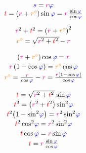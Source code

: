 \documentclass[11pt,twoside]{book}
\begin{document}
\[\begin{array}{c}
{\color{blue}s} = {\color{magenta}r} {\color{blue}\varphi} \\
{\color{red}t} = \left( {\color{magenta}r} + {\color{orange}r^{\diamond}} \right) \operatorname{sin} {\color{blue}\varphi} = {\color{magenta}r} \, \textstyle\frac{\operatorname{sin} {\color{blue}\varphi}}{\operatorname{cos} {\color{blue}\varphi}}
\end{array}\]

\[\begin{array}{c}
{\color{magenta}r}^2 + {\color{red}t}^2 = \left( {\color{magenta}r} + {\color{orange}r^{\diamond}} \right)^2 \\[0.2em]
{\color{orange}r^{\diamond}} = \sqrt{{\color{magenta}r}^2 + {\color{red}t}^2 \,} \! - {\color{magenta}r}
\end{array}\]

\[\begin{array}{c}
\left( {\color{magenta}r} + {\color{orange}r^{\diamond}} \right) \operatorname{cos} {\color{blue}\varphi} = {\color{magenta}r} \\[0.2em]
{\color{magenta}r} \left( 1 - {\operatorname{cos} {\color{blue}\varphi}} \right) = {\color{orange}r^{\diamond}} \operatorname{cos} {\color{blue}\varphi} \\[0.2em]
{\color{orange}r^{\diamond}} = \textstyle\frac{\color{magenta}r}{\operatorname{cos} {\color{blue}\varphi}} - {\color{magenta}r} = \textstyle\frac{{\color{magenta}r} \left( 1 - {\operatorname{cos} {\color{blue}\varphi}} \right)}{\operatorname{cos} {\color{blue}\varphi}}
\end{array}\]

\[\begin{array}{c}
{\color{red}t} = \sqrt{{\color{magenta}r}^2 + {\color{red}t}^2 \,} \operatorname{sin} {\color{blue}\varphi} \\[0.2em]
{\color{red}t}^2 = \left( {\color{magenta}r}^2 + {\color{red}t}^2 \right) \operatorname{sin}^{2\!} {\color{blue}\varphi} \\[0.2em]
{\color{red}t}^2 \! \left( 1 - \operatorname{sin}^{2\!} {\color{blue}\varphi} \right) = {\color{magenta}r}^2 \operatorname{sin}^{2\!} {\color{blue}\varphi} \\[0.2em]
{\color{red}t}^2 \operatorname{cos}^{2\!} {\color{blue}\varphi} = {\color{magenta}r}^2 \operatorname{sin}^{2\!} {\color{blue}\varphi} \\[0.2em]
{\color{red}t} \operatorname{cos} {\color{blue}\varphi} = {\color{magenta}r} \operatorname{sin} {\color{blue}\varphi} \\[0.2em]
{\color{red}t} = {\color{magenta}r} \, \textstyle\frac{\operatorname{sin} {\color{blue}\varphi}}{\operatorname{cos} {\color{blue}\varphi}} \\[0.2em]
\end{array}\]
\end{document}
